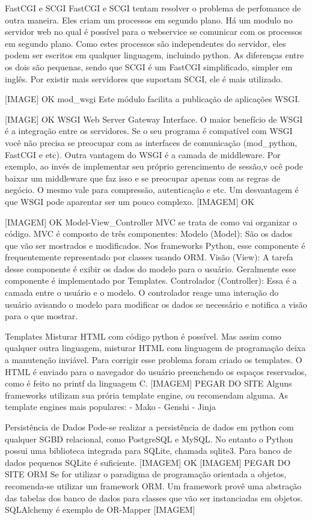 \documentclass[a4paper, 12pt]{article}
\begin{document}
\begin{enumerate}
  FastCGI e SCGI
  FastCGI e SCGI tentam resolver o problema de perfomance de outra maneira. Eles criam um processos em segundo plano. Há um modulo no servidor web no qual é possível para o webservice se comunicar com os processos em segundo plano. Como estes processos são independentes do servidor, eles podem ser escritos em qualquer linguagem, incluindo python. As diferenças entre os dois são pequenas, sendo que SCGI é um FastCGI simplificado, simpler em inglês. Por existir mais servidores que suportam SCGI, ele é mais utilizado.

  [IMAGE] OK
  mod_wsgi
  Este módulo facilita a publicação de aplicações WSGI.

  [IMAGE] OK
  WSGI
  Web Server Gateway Interface.
  O maior benefício de WSGI é a integração entre os servidores. Se o seu programa é compatível com WSGI você não precisa se preocupar com as interfaces de comunicação (mod_python, FastCGI e etc). Outra vantagem do WSGI é a camada de middleware. Por exemplo, ao invés de implementar seu próprio gerencimento de sessão,v ocê pode baixar um middleware que faz isso e se preocupar apenas com as regras de negócio. O mesmo vale para compressão, autenticação e etc.
  Um desvantagem é que WSGI pode aparentar ser um pouco complexo.
  [IMAGEM] OK

  [IMAGEM] OK
  Model-View_Controller
  MVC se trata de como vai organizar o código. MVC é composto de três componentes:
  Modelo (Model):  São os dados que vão ser mostrados e modificados. Nos frameworks Python, esse componente é frequentemente representado por classes usando ORM.
  Visão (View): A tarefa desse componente é exibir os dados do modelo para o usuário. Geralmente esse componente é implementado por Templates.
  Controlador (Controller): Essa é a camada entre o usuário e o modelo. O controlador reage uma interação do usuário avisando o modelo para modificar os dados se necessário e notifica a visão para o que mostrar.

  Templates
  Misturar HTML com código python é possível. Mas assim como qualquer outra linguagem, misturar HTML com linguagem de programação deixa a manutenção inviável. Para corrigir esse problema foram criado os templates.
  O HTML é enviado para o navegador do usuário preenchendo os espaços reservados, como é feito no printf da linguagem C.
  [IMAGEM] PEGAR DO SITE
  Alguns frameworks utilizam sua prória template engine, ou recomendam alguma.
  As template engines mais populares:
  - Mako
  - Genshi
  - Jinja

  Persistência de Dados
  Pode-se realizar a persistência de dados em python com qualquer SGBD relacional, como PostgreSQL e MySQL. No entanto o Python possui uma biblioteca integrada para SQLite, chamada sqlite3. Para banco de dados pequenos SQLite é suficiente.
  [IMAGEM] OK
  [IMAGEM] PEGAR DO SITE
  ORM
  Se for utilizar o paradigma de programação orientada a objetos, recomenda-se utilizar um framework ORM. Um framework provê uma abstração das tabelas dos banco de dados para classes que vão ser instanciadas em objetos.
  SQLAlchemy é exemplo de OR-Mapper [IMAGEM]


\end{enumerate}
\end{document}
